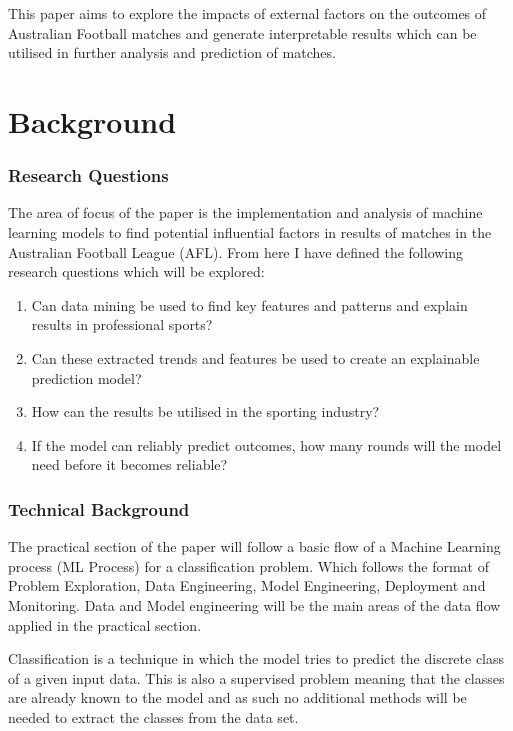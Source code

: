 \documentclass{imc-inf}
\begin{document}
	This paper aims to explore the impacts of external factors on the outcomes of Australian Football matches and generate interpretable results which can be utilised in further analysis and prediction of matches.
	
	
	\chapter{Background}\label{chap:background}
	\subsection{Research Questions}
	
	The area of focus of the paper is the implementation and analysis of machine learning models to find potential influential factors in results of matches in the Australian Football League (AFL).
	From here I have defined the following research questions which will be explored:
	\begin{enumerate}
		
		\item[] Can data mining be used to find key features and patterns and explain results in professional sports?
		
		\item[]Can these extracted trends and features be used to create an explainable prediction model?
		
		\item[] How can the results be utilised in the sporting industry?
		
		\item[] If the model can reliably predict outcomes, how many rounds will the model need before it becomes reliable?
	\end{enumerate}
	
	
	\subsection{Technical Background}
	The practical section of the paper will follow a basic flow of a Machine Learning process (ML Process) for a classification problem. Which follows the format of Problem Exploration, Data Engineering, Model Engineering, Deployment and Monitoring. Data and Model engineering will be the main areas of the data flow applied in the practical section.
	
	Classification is a technique in which the model tries to predict the discrete class of a given input data. This is also a supervised problem meaning that the classes are already known to the model and as such no additional methods will be needed to extract the classes from the data set.
	\newline
	
\end{document}
